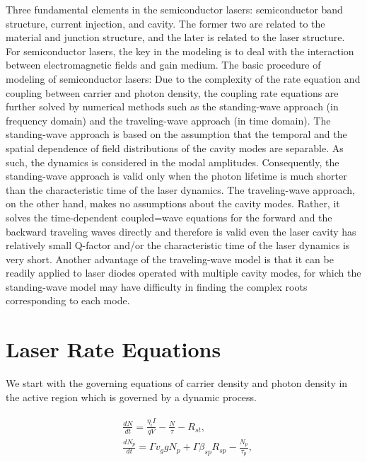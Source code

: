 Three fundamental elements in the semiconductor lasers: semiconductor band
structure, current injection, and cavity. The former two are related to the
material and junction structure, and the later is related to the laser
structure. For semiconductor lasers, the key in the modeling is to deal with
the interaction between electromagnetic fields and gain medium. The basic
procedure of modeling of semiconductor lasers: Due to the complexity of the
rate equation and coupling between carrier and photon density, the coupling
rate equations are further solved by numerical methods such as the
standing-wave approach (in frequency domain) and the traveling-wave approach
(in time domain). The standing-wave approach is based on the assumption that the
temporal and the spatial dependence of field distributions of the cavity modes
are separable. As such, the dynamics is considered in the modal amplitudes.
Consequently, the standing-wave approach is valid only when the photon lifetime
is much shorter than the characteristic time of the laser dynamics. The
traveling-wave approach, on the other hand, makes no assumptions about the
cavity modes. Rather, it solves the time-dependent coupled=wave equations for
the forward and the backward traveling waves directly and therefore is valid
even the laser cavity has relatively small Q-factor and/or the characteristic
time of the laser dynamics is very short. Another advantage of the
traveling-wave model is that it can be readily applied to laser diodes operated
with multiple cavity modes, for which the standing-wave model may have
difficulty in finding the complex roots corresponding to each mode.

\section{Laser Rate Equations} \label{corrections} 

We start with the governing equations of carrier density and photon density in
the active region which is governed by a dynamic process.

\begin{eqnarray}
\begin{aligned}
  & \frac{dN}{dt} = \frac{\eta_{i}I}{qV} - \frac{N}{\tau} - R_{st},
  \\
  & \frac{dN_p}{dt} = {\Gamma}v_g{g}N_p + \Gamma\beta_{sp}R_{sp} - \frac{N_p}{\tau_p},
\end{aligned}
\label{eq:eight}
\end{eqnarray}

